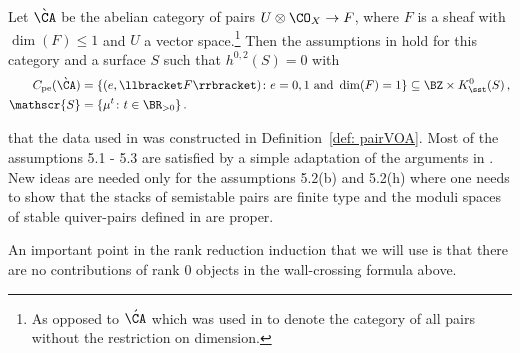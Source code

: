 \begin{assumption}
\notready
\label{ass:WCpair}
Let $\grave{\CA}$ be the abelian category of pairs $U\otimes \CO_X\to F$, where $F$ is a sheaf with $\dim(F)\leq 1$ and $U$ a vector space.\footnote{As opposed to $\acute{\CA}$ which was used in \cite{Jo21} to denote the category of all pairs without the restriction on dimension.}
Then the assumptions in \cite[Assumption 5.1-5.3]{Jo21} hold for this category and a surface $S$ such that $h^{0,2}(S)=0$ with
\begin{align*}
C_{\textup{pe}}(\grave{\CA})&=\{(e,\llbracket F\rrbracket)\colon e=0,1\textup{ and }\dim(F)= 1\}\subseteq \BZ\times K_\sst^0(S)\,,\\
\mathscr{S}&=\{\mu^t\colon t\in \BR_{>0}\}\,.
\end{align*}
\end{assumption}
\begin{remark}
\notreadyNote that the data used in \cite[Assumption 4.4]{Jo21} was constructed in Definition~\ref{def: pairVOA}. Most of the assumptions 5.1 - 5.3 are satisfied by a simple adaptation of the arguments in \cite[Sections 8.2 and 8.3]{Jo21}. New ideas are needed only for the assumptions 5.2(b) and 5.2(h)  where one needs to show that the stacks of semistable pairs are finite type and the moduli spaces of stable quiver-pairs defined in \cite[Def. 5.5]{Jo21} are proper.\end{remark}

An important point in the rank reduction induction that we will use is that there are no contributions of rank 0 objects in the wall-crossing formula above.

